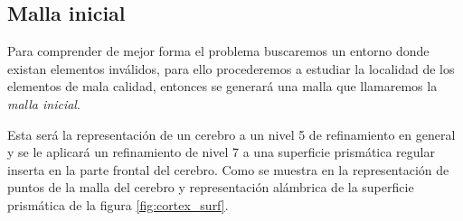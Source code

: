 

\subsection{Malla inicial}

Para comprender de mejor forma el problema buscaremos un entorno donde existan elementos inválidos, para ello procederemos a estudiar la localidad de los elementos de mala calidad, entonces se generará una malla que llamaremos la \textit{malla inicial}.

Esta será la representación de un cerebro a un nivel 5 de refinamiento en general y se le aplicará un refinamiento de nivel 7 a una superficie prismática regular inserta en la parte frontal del cerebro. Como se muestra en la representación de puntos de la malla del cerebro y representación alámbrica de la superficie prismática de la figura \ref{fig:cortex_surf}.

